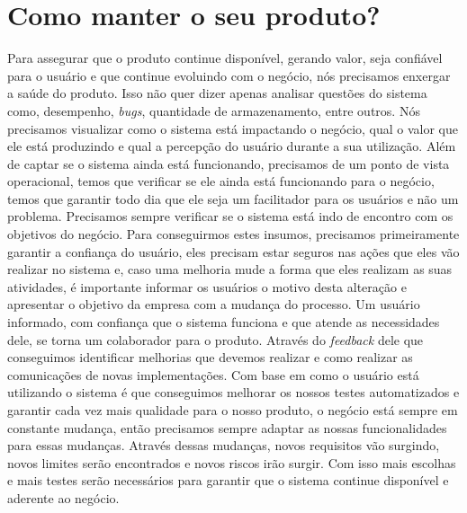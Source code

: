   \section{Como manter o seu produto?}
    Para assegurar que o produto continue disponível, gerando valor, seja confiável
    para o usuário e que continue evoluindo com o negócio, nós precisamos enxergar
    a saúde do produto. Isso não quer dizer apenas analisar questões do sistema
    como, desempenho, \textit{bugs}, quantidade de armazenamento, entre outros.
    Nós precisamos visualizar como o sistema está impactando o negócio, qual o
    valor que ele está produzindo e qual a percepção do usuário durante a sua
    utilização. Além de captar se o sistema ainda está funcionando, precisamos de
    um ponto de vista operacional, temos que verificar se ele ainda está funcionando
    para o negócio, temos que garantir todo dia que ele seja um facilitador para
    os usuários e não um problema. Precisamos sempre verificar se o sistema está
    indo de encontro com os objetivos do negócio. \newline
    Para conseguirmos estes insumos, precisamos primeiramente garantir a confiança
    do usuário, eles precisam estar seguros nas ações que eles vão realizar no
    sistema e, caso uma melhoria mude a forma que eles realizam as suas atividades,
    é importante informar os usuários o motivo desta alteração e apresentar o
    objetivo da empresa com a mudança do processo. Um usuário informado, com
    confiança que o sistema funciona e que atende as necessidades dele, se torna
    um colaborador para o produto. Através do \textit{feedback} dele que conseguimos
    identificar melhorias que devemos realizar e como realizar as comunicações de
    novas implementações. Com base em como o usuário está utilizando o sistema
    é que conseguimos melhorar os nossos testes automatizados e garantir cada vez
    mais qualidade para o nosso produto, o negócio está sempre em constante
    mudança, então precisamos sempre adaptar as nossas funcionalidades para essas
    mudanças. Através dessas mudanças, novos requisitos vão surgindo, novos
    limites serão encontrados e novos riscos irão surgir. Com isso mais escolhas
    e mais testes serão necessários para garantir que o sistema continue disponível
    e aderente ao negócio.


